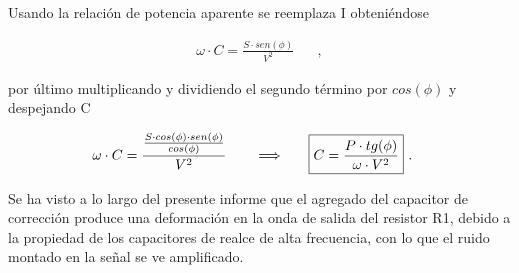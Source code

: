     Usando la relación de potencia aparente se reemplaza I obteniéndose 

    \begin{align*}
      \omega \cdot C = \frac{S \cdot sen(\phi)}{V^2} \hspace{20pt},
    \end{align*}

    por último multiplicando y dividiendo el segundo término por $cos(\phi)$ y despejando C

    \begin{align*}
       \omega \cdot C = \frac{ \frac{S \cdot cos(\phi) \cdot sen(\phi)}{cos(\phi)}}{V^2}\hspace{20pt} \Longrightarrow \hspace{20pt} \Aboxed{C = \frac{P \cdot tg(\phi)}{\omega \cdot V^2}}\ .
    \end{align*}

    Se ha visto a lo largo del presente informe que el agregado del capacitor de corrección produce
    una deformación en la onda de salida del resistor R1, debido a la propiedad de los capacitores de 
    realce de alta frecuencia, con lo que el ruido montado en la señal se ve amplificado.
    

    
